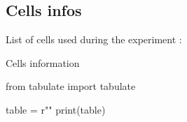 \subsection{Cells infos}

List of cells used during the experiment : 

\begin{table}[h]
\caption{Cells information}
\begin{pycode}

from tabulate import tabulate

table = r""
print(table)
\end{pycode}
\label{table-ensemencement}
\end{table}